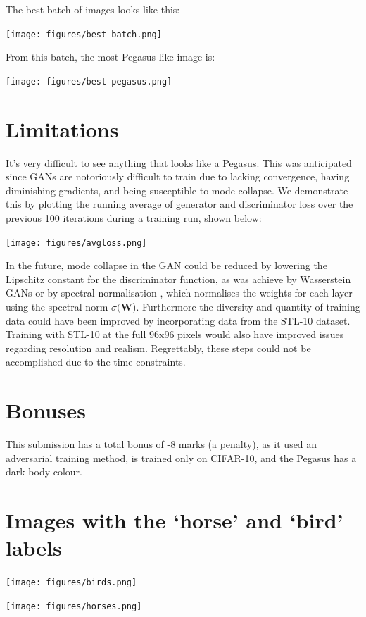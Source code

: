 \documentclass{article}
\begin{document}
The best batch of images looks like this:
\begin{center}
    \texttt{[image: figures/best-batch.png]}
\end{center}

From this batch, the most Pegasus-like image is:
\begin{center}
    \texttt{[image: figures/best-pegasus.png]}
\end{center}

\section{Limitations}
It's very difficult to see anything that looks like a Pegasus. This was anticipated since GANs are notoriously difficult to train due to lacking convergence, having diminishing gradients, and being susceptible to mode collapse. We demonstrate this by plotting the running average of generator and discriminator loss over the previous 100 iterations during a training run, shown below:
\begin{center}
    \texttt{[image: figures/avgloss.png]}
\end{center}

In the future, mode collapse in the GAN could be reduced by lowering the Lipschitz constant for the discriminator function, as was achieve by Wasserstein GANs \cite{arjovsky2017wasserstein} or by spectral normalisation \cite{DBLP:journals/corr/abs-1802-05957}, which normalises the weights for each layer using the spectral norm $\sigma(\mathbf{W}$). Furthermore the diversity and quantity of training data could have been improved by incorporating data from the STL-10 dataset. Training with STL-10 at the full 96x96 pixels would also have improved issues regarding resolution and realism. Regrettably, these steps could not be accomplished due to the time constraints.

\section*{Bonuses}
This submission has a total bonus of -8 marks (a penalty), as it used an adversarial training method, is trained only on CIFAR-10, and the Pegasus has a dark body colour.

\appendix
\section{Images with the `horse' and `bird' labels} \label{appendix:A}
\begin{center}
    \texttt{[image: figures/birds.png]}
\end{center}
\begin{center}
    \texttt{[image: figures/horses.png]}
\end{center}
\end{document}
